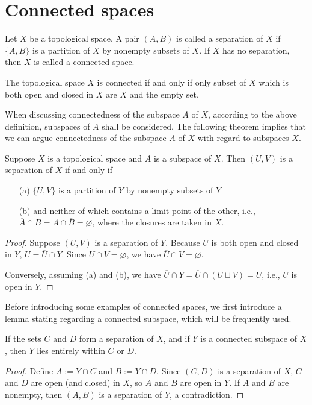 \section{Connected spaces}

\begin{defi}
    Let $X$ be a topological space.
    A pair $(A, B)$ is called a separation of $X$ if $\{A, B\}$ is a partition of $X$ by nonempty subsets of $X$.
    If $X$ has no separation, then $X$ is called a connected space.
\end{defi}
\begin{rmk}
    The topological space $X$ is connected if and only if only subset of $X$ which is both open and closed in $X$ are $X$ and the empty set.
\end{rmk}

When discussing connectedness of the subspace $A$ of $X$, according to the above definition, subspaces of $A$ shall be considered.
The following theorem implies that we can argue connectedness of the subspace $A$ of $X$ with regard to subspaces $X$.
\begin{thm}
    Suppose $X$ is a topological space and $A$ is a subspace of $X$.
    Then $(U, V)$ is a separation of $X$ if and only if
    \begin{enumerate}
        \item[(a)] $\{U, V\}$ is a partition of $Y$ by nonempty subsets of $Y$
        \item[(b)] and neither of which contains a limit point of the other, i.e., $\overline{A}\cap B=A\cap\overline{B}=\varnothing$, where the closures are taken in $X$.
    \end{enumerate}
\end{thm}
\begin{proof}
    Suppose $(U, V)$ is a separation of $Y$.
    Because $U$ is both open and closed in $Y$, $U=\overline{U}\cap Y$.
    Since $U\cap V=\varnothing$, we have $\overline{U}\cap V=\varnothing$.

    Conversely, assuming (a) and (b), we have $\overline{U}\cap Y=\overline{U}\cap(U\sqcup V)=U$, i.e., $U$ is open in $Y$.
\end{proof}

Before introducing some examples of connected spaces, we first introduce a lemma stating regarding a connected subspace, which will be frequently used.
\begin{lem}
    If the sets $C$ and $D$ form a separation of $X$, and if $Y$ is a connected subspace of $X$, then $Y$ lies entirely within $C$ or $D$.
\end{lem}
\begin{proof}
    Define $A:=Y\cap C$ and $B:=Y\cap D$.
    Since $(C, D)$ is a separation of $X$, $C$ and $D$ are open (and closed) in $X$, so $A$ and $B$ are open in $Y$.
    If $A$ and $B$ are nonempty, then $(A, B)$ is a separation of $Y$, a contradiction.
\end{proof}

